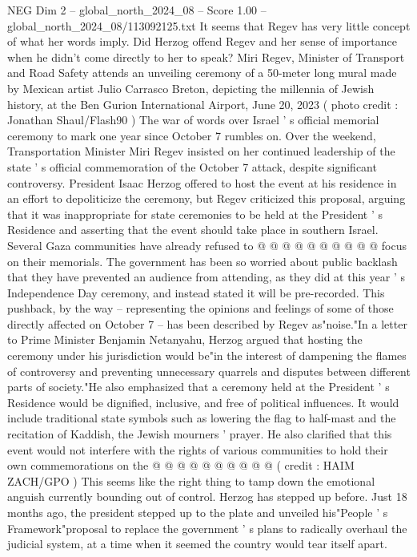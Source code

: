 \begin{textsample}{NEG Dim 2 – global\_north\_2024\_08 – Score 1.00 – global\_north\_2024\_08/113092125.txt}  \label{ex:f2_neg_055}
It seems that Regev has very little concept of what her words imply.
Did Herzog offend Regev and her sense of importance when he didn't come directly to her to speak?
Miri Regev, Minister of Transport and Road Safety attends an unveiling ceremony of a 50-meter long mural made by Mexican artist Julio Carrasco Breton, depicting the millennia of Jewish history, at the Ben Gurion International Airport, June 20, 2023 ( photo credit : Jonathan Shaul/Flash90 ) The war of words over Israel ' s official memorial ceremony to mark one year since October 7 rumbles on.
Over the weekend, Transportation Minister Miri Regev insisted on her continued leadership of the state ' s official commemoration of the October 7 attack, despite significant controversy.
President Isaac Herzog offered to host the event at his residence in an effort to depoliticize the ceremony, but Regev criticized this proposal, arguing that it was inappropriate for state ceremonies to be held at the President ' s Residence and asserting that the event should take place in southern Israel.
Several Gaza communities have already refused to @ @ @ @ @ @ @ @ @ @ focus on their memorials.
The government has been so worried about public backlash that they have prevented an audience from attending, as they did at this year ' s Independence Day ceremony, and instead stated it will be pre-recorded.
This pushback, by the way -- representing the opinions and feelings of some of those directly affected on October 7 -- has been described by Regev as"noise."In a letter to Prime Minister Benjamin Netanyahu, Herzog argued that hosting the ceremony under his jurisdiction would be"in the interest of dampening the flames of controversy and preventing unnecessary quarrels and disputes between different parts of society."He also emphasized that a ceremony held at the President ' s Residence would be dignified, inclusive, and free of political influences.
It would include traditional state symbols such as lowering the flag to half-mast and the recitation of Kaddish, the Jewish mourners ' prayer.
He also clarified that this event would not interfere with the rights of various communities to hold their own commemorations on the @ @ @ @ @ @ @ @ @ @ ( credit : HAIM ZACH/GPO ) This seems like the right thing to tamp down the emotional anguish currently bounding out of control.
Herzog has stepped up before.
Just 18 months ago, the president stepped up to the plate and unveiled his"People ' s Framework"proposal to replace the government ' s plans to radically overhaul the judicial system, at a time when it seemed the country would tear itself apart.

\end{textsample}
